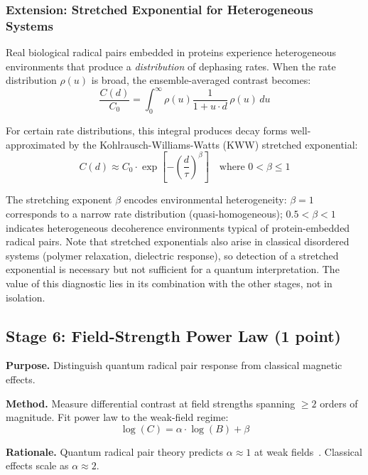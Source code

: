 \documentclass[preprint,amsmath,amssymb]{revtex4-2}
\begin{document}
\subsubsection{Extension: Stretched Exponential for Heterogeneous Systems}

Real biological radical pairs embedded in proteins experience heterogeneous environments that produce a \emph{distribution} of dephasing rates. When the rate distribution $\rho(u)$ is broad, the ensemble-averaged contrast becomes:
\begin{equation}
\frac{C(d)}{C_0} = \int_0^\infty \rho(u) \frac{1}{1 + u \cdot d} \, \rho(u) \, du
\end{equation}

For certain rate distributions, this integral produces decay forms well-approximated by the Kohlrausch-Williams-Watts (KWW) stretched exponential:
\begin{equation}
C(d) \approx C_0 \cdot \exp\left[-\left(\frac{d}{\tau}\right)^\beta\right] \quad \text{where } 0 < \beta \leq 1
\end{equation}

The stretching exponent $\beta$ encodes environmental heterogeneity: $\beta = 1$ corresponds to a narrow rate distribution (quasi-homogeneous); $0.5 < \beta < 1$ indicates heterogeneous decoherence environments typical of protein-embedded radical pairs. Note that stretched exponentials also arise in classical disordered systems (polymer relaxation, dielectric response), so detection of a stretched exponential is necessary but not sufficient for a quantum interpretation. The value of this diagnostic lies in its combination with the other stages, not in isolation.

\subsection{Stage 6: Field-Strength Power Law (1 point)}

\textbf{Purpose.} Distinguish quantum radical pair response from classical magnetic effects.

\textbf{Method.} Measure differential contrast at field strengths spanning $\geq 2$ orders of magnitude. Fit power law to the weak-field regime:
\begin{equation}
\log(C) = \alpha \cdot \log(B) + \beta
\end{equation}

\textbf{Rationale.} Quantum radical pair theory predicts $\alpha \approx 1$ at weak fields~\cite{timmel1998}. Classical effects scale as $\alpha \approx 2$.
\end{document}

